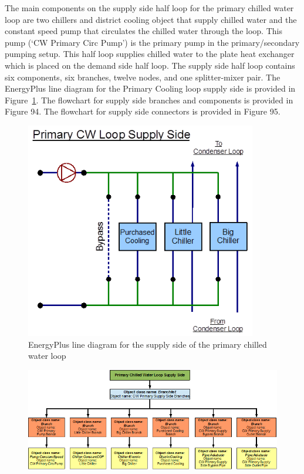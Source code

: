 The main components on the supply side half loop for the primary chilled water loop are two chillers and district cooling object that supply chilled water and the constant speed pump that circulates the chilled water through the loop. This pump (`CW Primary Circ Pump') is the primary pump in the primary/secondary pumping setup. This half loop supplies chilled water to the plate heat exchanger which is placed on the demand side half loop. The supply side half loop contains six components, six branches, twelve nodes, and one splitter-mixer pair. The EnergyPlus line diagram for the Primary Cooling loop supply side is provided in Figure~\ref{fig:energyplus-line-diagram-for-the-supply-side-005}. The flowchart for supply side branches and components is provided in Figure 94. The flowchart for supply side connectors is provided in Figure 95.

\begin{figure}[hbtp] %
\centering
\includegraphics[width=0.9\textwidth, height=0.9\textheight, keepaspectratio=true]{media/image093.png}
\caption{EnergyPlus line diagram for the supply side of the primary chilled water loop \protect \label{fig:energyplus-line-diagram-for-the-supply-side-005}}
\end{figure}

\begin{figure}[htbp]
\centering
\includegraphics{media/image094.png}
\caption{}
\end{figure}

